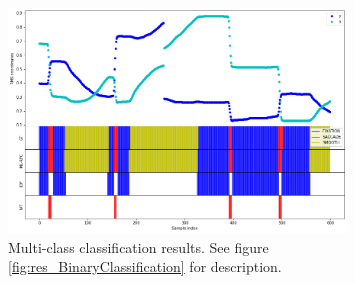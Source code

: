 \begin{figure}[h]
    \centering
    \includegraphics[width=0.8\textwidth]{Images/Classification/MultiClassification.png}
    \caption{Multi-class classification results. See figure \ref{fig:res_BinaryClassification} for description. }
    \label{fig:res_MultiClassification}
\end{figure}

